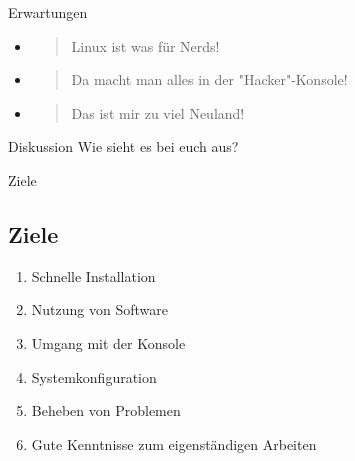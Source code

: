 \begin{frame}{Erwartungen}
    \begin{itemize}
        \item \begin{quote}
                  Linux ist was für Nerds!
        \end{quote}\pause
        \item \begin{quote}
                  Da macht man alles in der "Hacker"-Konsole!
        \end{quote}\pause
        \item \begin{quote}
                  Das ist mir zu viel Neuland!
        \end{quote}
    \end{itemize}

    \pause
    \vspace{0.5cm}
    \begin{alertblock}{Diskussion}
        Wie sieht es bei euch aus?
    \end{alertblock}

\end{frame}

\begin{frame}{Ziele}
    \subsection{Ziele}\label{subsec:ziele}

    \begin{enumerate}
        \item Schnelle Installation\pause
        \item Nutzung von Software\pause
        \item Umgang mit der Konsole\pause
        \item Systemkonfiguration\pause
        \item Beheben von Problemen\pause
        \item Gute Kenntnisse zum eigenständigen Arbeiten\pause
    \end{enumerate}

\end{frame}